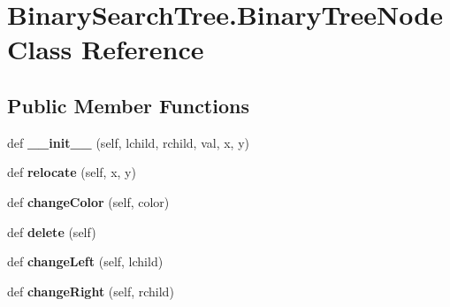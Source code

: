 \hypertarget{class_binary_search_tree_1_1_binary_tree_node}{}\section{Binary\+Search\+Tree.\+Binary\+Tree\+Node Class Reference}
\label{class_binary_search_tree_1_1_binary_tree_node}
\subsection*{Public Member Functions}
\begin{DoxyCompactItemize}
\item 
def {\bfseries \+\_\+\+\_\+init\+\_\+\+\_\+} (self, lchild, rchild, val, x, y)\hypertarget{class_binary_search_tree_1_1_binary_tree_node_a82eeb27919e933cb0bbab2bb19a4674a}{}\label{class_binary_search_tree_1_1_binary_tree_node_a82eeb27919e933cb0bbab2bb19a4674a}

\item 
def {\bfseries relocate} (self, x, y)\hypertarget{class_binary_search_tree_1_1_binary_tree_node_aa7b30f6a083e5eb57d4048c6a83bfff1}{}\label{class_binary_search_tree_1_1_binary_tree_node_aa7b30f6a083e5eb57d4048c6a83bfff1}

\item 
def {\bfseries change\+Color} (self, color)\hypertarget{class_binary_search_tree_1_1_binary_tree_node_ab9dc94fd42e8ef8e1d7f5d5e62bb613a}{}\label{class_binary_search_tree_1_1_binary_tree_node_ab9dc94fd42e8ef8e1d7f5d5e62bb613a}

\item 
def {\bfseries delete} (self)\hypertarget{class_binary_search_tree_1_1_binary_tree_node_a4697a030e64bcc4abf33c3c1e10febbd}{}\label{class_binary_search_tree_1_1_binary_tree_node_a4697a030e64bcc4abf33c3c1e10febbd}

\item 
def {\bfseries change\+Left} (self, lchild)\hypertarget{class_binary_search_tree_1_1_binary_tree_node_af69ab5e5100d035c4808ce89e2e6e835}{}\label{class_binary_search_tree_1_1_binary_tree_node_af69ab5e5100d035c4808ce89e2e6e835}

\item 
def {\bfseries change\+Right} (self, rchild)\hypertarget{class_binary_search_tree_1_1_binary_tree_node_a630b102ad6c1ccbdca6fd3b8f19260db}{}\label{class_binary_search_tree_1_1_binary_tree_node_a630b102ad6c1ccbdca6fd3b8f19260db}


\end{DoxyCompactItemize}
